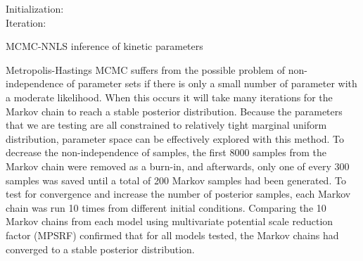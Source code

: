 \documentclass[12pt]{nature}\usepackage{graphicx, color}
\begin{document}
\begin{algorithm}[H]\vspace{2mm}
 \vspace{2mm}
 Initialization:\\
Iteration:\\
\vspace{2mm}
\caption{MCMC-NNLS inference of kinetic parameters}
\label{MCMCalg}
\end{algorithm}

Metropolis-Hastings MCMC suffers from the possible problem of non-independence of parameter sets if there is only a small number of parameter with a moderate likelihood.  When this occurs it will take many iterations for the Markov chain to reach a stable posterior distribution.  Because the parameters that we are testing are all constrained to relatively tight marginal uniform distribution, parameter space can be effectively explored with this method.  To decrease the non-independence of samples, the first 8000 samples from the Markov chain were removed as a burn-in, and afterwards, only one of every 300 samples was saved until a total of 200 Markov samples had been generated.  To test for convergence and increase the number of posterior samples, each Markov chain was run 10 times from different initial conditions.  Comparing the 10 Markov chains from each model using multivariate potential scale reduction factor (MPSRF)\cite{Brooks:1997um} confirmed that for all models tested, the Markov chains had converged to a stable posterior distribution.
\end{document}
